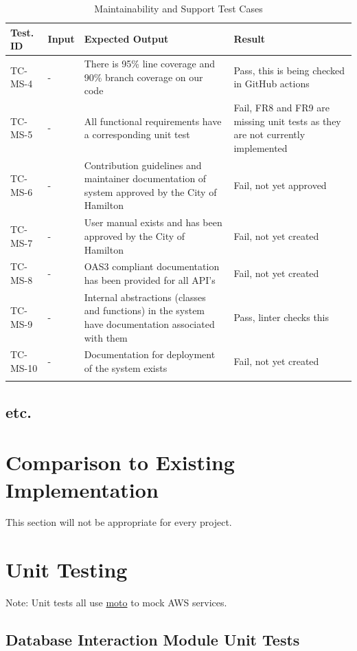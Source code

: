 \documentclass[12pt, titlepage]{article}
\begin{document}
\begin{longtable}{|m{2cm}|m{1cm}|m{6cm}|m{3cm}|}
  \hline
  \textbf{Test. ID} & \textbf{Input} & \textbf{Expected Output} &
  \textbf{Result} \\
  \hline
  TC-MS-4 & - & There is 95\% line coverage and 90\% branch coverage
  on our code & Pass, this is being checked in GitHub actions\\ \hline
  TC-MS-5 & - & All functional requirements have a corresponding unit
  test & Fail, FR8 and FR9 are missing unit tests as they are not
  currently implemented\\ \hline
  TC-MS-6 & - & Contribution guidelines and maintainer documentation
  of system approved by the City of Hamilton & Fail, not yet approved\\ \hline
  TC-MS-7 & - & User manual exists and has been approved by the City
  of Hamilton & Fail, not yet created\\ \hline
  TC-MS-8 & - & OAS3 compliant documentation has been provided for
  all API's & Fail, not yet created\\ \hline
  TC-MS-9 & - & Internal abstractions (classes and functions) in the
  system have documentation associated with them & Pass, linter
  checks this\\ \hline
  TC-MS-10 & - & Documentation for deployment of the system exists &
  Fail, not yet created\\ \hline
  \caption{Maintainability and Support Test Cases}
\end{longtable}

\subsection{etc.}

\section{Comparison to Existing Implementation}

This section will not be appropriate for every project.

\section{Unit Testing}

Note: Unit tests all use \href{https://pypi.org/project/moto/}{moto}
to mock AWS services.

\subsection{Database Interaction Module Unit Tests}
\end{document}
